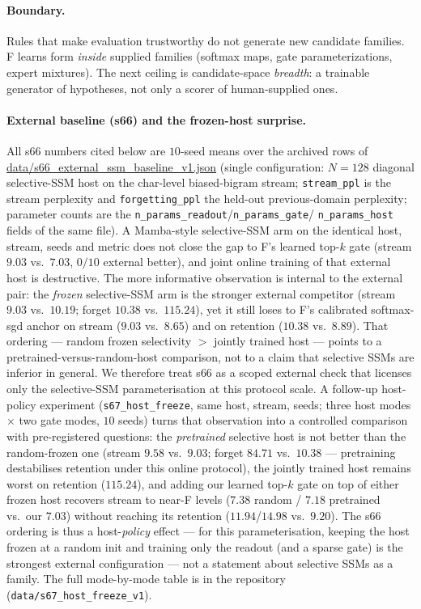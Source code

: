 \documentclass[preprint,12pt]{elsarticle}
\begin{document}
\paragraph{Boundary.}
Rules that make evaluation trustworthy do not generate new candidate
families. F learns form \emph{inside} supplied families (softmax maps,
gate parameterizations, expert mixtures). The next ceiling is
candidate-space \emph{breadth}: a trainable generator of hypotheses,
not only a scorer of human-supplied ones.

\paragraph{External baseline (s66) and the frozen-host surprise.}
{\sloppy
All s66 numbers cited below are $10$-seed means over the archived rows
of \url{data/s66_external_ssm_baseline_v1.json} (single
configuration: $N{=}128$ diagonal selective-SSM host on the char-level
biased-bigram stream; \texttt{stream\_ppl} is the stream perplexity and
\texttt{forgetting\_ppl} the held-out previous-domain perplexity; parameter
counts are the \texttt{n\_params\_readout}/\texttt{n\_params\_gate}/
\texttt{n\_params\_host} fields of the same file).
A Mamba-style selective-SSM arm on the identical host,
stream, seeds and metric does not close the gap to F's learned top-$k$
gate (stream $9.03$ vs.\ $7.03$, $0/10$ external better), and joint
online training of that external host is destructive. The more
informative observation is internal to the external pair: the
\emph{frozen} selective-SSM arm is the stronger external competitor
(stream $9.03$ vs.\ $10.19$; forget $10.38$ vs.\ $115.24$), yet it
still loses to F's calibrated softmax-sgd anchor on stream
($9.03$ vs.\ $8.65$) and on retention ($10.38$ vs.\ $8.89$). That
ordering --- random frozen selectivity $>$ jointly trained host ---
points to a pretrained-versus-random-host comparison, not to a claim
that selective SSMs are inferior in general. We therefore treat s66
as a scoped external check that licenses only the selective-SSM
parameterisation at this protocol scale. A follow-up host-policy
experiment (\texttt{s67\_host\_freeze}, same host, stream, seeds;
three host modes $\times$ two gate modes, $10$ seeds) turns that
observation into a controlled comparison with pre-registered
questions: the \emph{pretrained} selective host is not better than
the random-frozen one (stream $9.58$ vs.\ $9.03$; forget $84.71$
vs.\ $10.38$ --- pretraining destabilises retention under this
online protocol), the jointly trained host remains worst on
retention ($115.24$), and adding our learned top-$k$ gate on top of
either frozen host recovers stream to near-F levels
($7.38$ random / $7.18$ pretrained vs.\ our $7.03$) without reaching
its retention ($11.94$/$14.98$ vs.\ $9.20$). The s66 ordering is thus
a host-\emph{policy} effect --- for this parameterisation, keeping
the host frozen at a random init and training only the readout (and a
sparse gate) is the strongest external configuration --- not a
statement about selective SSMs as a family. The full mode-by-mode
table is in the repository (\texttt{data/s67\_host\_freeze\_v1}).
}
\end{document}
